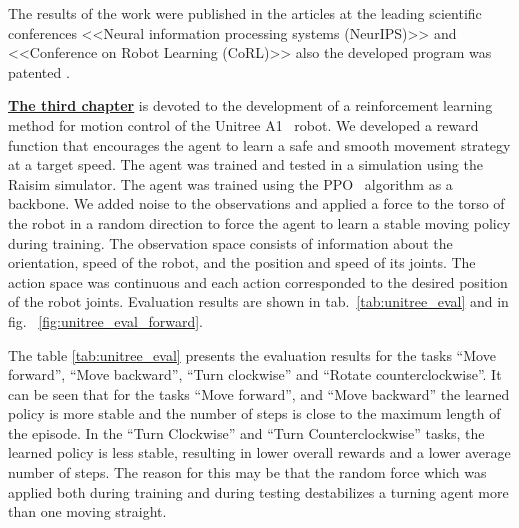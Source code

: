 The results of the work were published in the articles \cite{confbib1, confbib2} at the leading scientific conferences <<Neural information processing systems (NeurIPS)>> and <<Conference on Robot Learning (CoRL)>> also the developed program was patented \cite{progbib1}.

\underline{\textbf{The third chapter}} is devoted to the development of a reinforcement learning method for motion control of the Unitree A1~\cite{unitree} robot. We developed a reward function that encourages the agent to learn a safe and smooth movement strategy at a target speed. The agent was trained and tested in a simulation using the Raisim \cite{raisim} simulator. The agent was trained using the PPO~\cite{Schulman2017ProximalPO} algorithm as a backbone. We added noise to the observations and applied a force to the torso of the robot in a random direction to force the agent to learn a stable moving policy during training. The observation space consists of information about the orientation, speed of the robot, and the position and speed of its joints. The action space was continuous and each action corresponded to the desired position of the robot joints. Evaluation results are shown in tab.~\ref{tab:unitree_eval} and in fig.~ \ref{fig:unitree_eval_forward}. 

The table \ref{tab:unitree_eval} presents the evaluation results for the tasks ``Move forward'', ``Move backward'', ``Turn clockwise'' and ``Rotate counterclockwise''. It can be seen that for the tasks ``Move forward'', and ``Move backward'' the learned policy is more stable and the number of steps is close to the maximum length of the episode. In the ``Turn Clockwise'' and ``Turn Counterclockwise'' tasks, the learned policy is less stable, resulting in lower overall rewards and a lower average number of steps. The reason for this may be that the random force which was applied both during training and during testing destabilizes a turning agent more than one moving straight.

